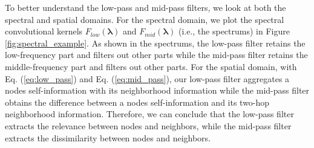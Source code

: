 \documentclass[letterpaper]{article} %
\begin{document}


To better understand the low-pass and mid-pass filters, we look at both the spectral and spatial domains. For the spectral domain, we plot the spectral convolutional kernels $F_{low}(\mathbf{\lambda})$ and $F_{mid}(\mathbf{\lambda})$ (i.e., the spectrums) in Figure \ref{fig:spectral_example}. As shown in the spectrums, the low-pass filter retains the low-frequency part and filters out other parts while the mid-pass filter retains the middle-frequency part and filters out other parts. For the spatial domain, with Eq. (\ref{eq:low_pass}) and Eq. (\ref{eq:mid_pass}), our low-pass filter aggregates a nodes self-information with its neighborhood information while the mid-pass filter obtains the difference between a nodes self-information and its two-hop neighborhood information. Therefore, we can conclude that the low-pass filter extracts the relevance between nodes and neighbors, while the mid-pass filter extracts the dissimilarity between nodes and neighbors.


\end{document}
